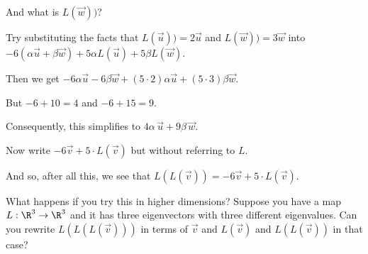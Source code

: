 \documentclass{ximera}
\begin{document}
\begin{question}
\begin{question}
    \begin{hint}
      \begin{question}
        \begin{solution}
          And what is $L(\vec{w}))$?

          \begin{multiple-choice}
          \end{multiple-choice} 
        \end{solution}
      \end{question}
    \end{hint}

    \begin{hint}
      Try substituting the facts that $L(\vec{u})) = 2 \vec{u}$ and $L(\vec{w})) = 3 \vec{w}$ into $-6 \left( \alpha \vec{u} + \beta \vec{w} \right) + 5 \alpha L(\vec{u}) + 5 \beta L(\vec{w})$.
    \end{hint}    

    \begin{hint}
      Then we get $-6 \alpha \vec{u} - 6 \beta \vec{w} + (5 \cdot 2) \alpha \vec{u} + (5 \cdot 3) \beta \vec{w}$.
    \end{hint}    

    \begin{hint}
      But $-6 + 10 = 4$ and $-6 + 15 = 9$.
    \end{hint}    

    \begin{hint}
      Consequently, this simplifies to $4\alpha\,\vec{u} + 9\beta\,\vec{w}$.
    \end{hint}    

    Now write $-6 \vec{v} + 5 \cdot L(\vec{v})$ but without referring to $L$.
    \begin{multiple-choice}
    \end{multiple-choice} 
  \end{question}

  And so, after all this, we see that $L(L(\vec{v})) = -6 \vec{v} + 5 \cdot L(\vec{v})$.

  What happens if you try this in higher dimensions?  Suppose you have
  a map $L : \R^3 \to \R^3$ and it has three eigenvectors with three
  different eigenvalues.  Can you rewrite $L(L(L(\vec{v})))$ in terms
  of $\vec{v}$ and $L(\vec{v})$ and $L(L(\vec{v}))$ in that case?

\end{question}
\end{document}
